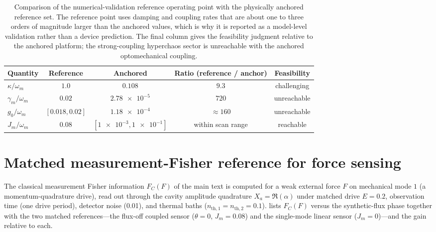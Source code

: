 \documentclass[preprint,numbers,a4paper]{elsarticle}
\begin{document}
\begin{table}[h]
  \centering
  \caption{Comparison of the numerical-validation reference operating point with the physically anchored reference set. The reference point uses damping and coupling rates that are about one to three orders of magnitude larger than the anchored values, which is why it is reported as a model-level validation rather than a device prediction. The final column gives the feasibility judgment relative to the anchored platform; the strong-coupling hyperchaos sector is unreachable with the anchored optomechanical coupling.}
  \label{SI-tab:si-pilot-vs-anchor}
  \begin{tabular}{@{}lcccc@{}}
    \toprule
    Quantity & Reference & Anchored & Ratio (reference / anchor) & Feasibility \\
    \midrule
    $\kappa/\omega_m$ & $\num{1.0}$ & $\num{0.108}$ & $\num{9.3}$ & challenging \\
    $\gamma_m/\omega_m$ & $\num{0.02}$ & $\num{2.78e-5}$ & $\num{720}$ & unreachable \\
    $g_0/\omega_m$ & $[\num{0.018},\num{0.02}]$ & $\num{1.18e-4}$ & $\approx\num{160}$ & unreachable \\
    $J_m/\omega_m$ & $\num{0.08}$ & $[\num{1e-3},\num{1e-1}]$ & within scan range & reachable \\
    \bottomrule
  \end{tabular}
\end{table}

\section{Matched measurement-Fisher reference for force sensing}
\label{SI-sec:matched-fisher}

The classical measurement Fisher information $F_C(F)$ of the main text is computed for a weak external force $F$ on mechanical mode $1$ (a momentum-quadrature drive), read out through the cavity amplitude quadrature $X_a=\Re(\alpha)$ under matched drive $E=\num{0.2}$, observation time (one drive period), detector noise (\num{0.01}), and thermal baths ($n_{\mathrm{th},1}=n_{\mathrm{th},2}=\num{0.1}$).  lists $F_C(F)$ versus the synthetic-flux phase together with the two matched references---the flux-off coupled sensor ($\theta=0$, $J_m=\num{0.08}$) and the single-mode linear sensor ($J_m=0$)---and the gain relative to each.
\end{document}
